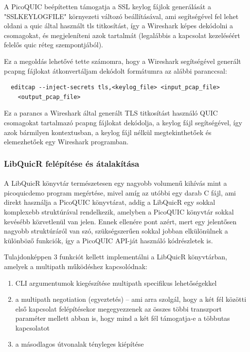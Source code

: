 \documentclass[a4paper,oneside]{article}
\begin{document}
A PicoQUIC beépítetten támogatja a SSL keylog fájlok generálását a "SSLKEYLOGFILE" környezeti változó 
beállításával, ami segítségével fel lehet oldani a quic által használt tls titkosítást,
így a Wireshark képes dekódolni a csomagokat, és megjeleníteni azok 
tartalmát (legalábbis a kapcsolat kezeléséért felelős quic réteg szempontjából).

Ez a megoldás lehetővé tette számomra, hogy a Wireshark segítségével generált 
pcapng fájlokat átkonvertáljam dekódolt formátumra az alábbi paranccsal:
\begin{verbatim}
  editcap --inject-secrets tls,<keylog_file> <input_pcap_file> 
    <output_pcap_file>
\end{verbatim}
Ez a parancs a Wireshark által generált TLS titkosítást használó QUIC 
csomagokat tartalmazó pcapng fájlokat dekódolja, a keylog fájl segítségével, így azok bármilyen kontextusban, a keylog fájl nélkül megtekinthetőek
és elemezhetőek egy Wireshark programban.


\subsubsection{LibQuicR felépítése és átalakítása}
\paragraph{}

A LibQuicR könyvtár természetesen egy nagyobb volumenű kihívás mint a picoquicdemo program 
megértése, mivel amíg az utóbbi egy darab C fájl, ami direkt használja a PicoQUIC könyvtárat,
addig a LibQuicR egy sokkal komplexebb struktúrával rendelkezik, amelyben a PicoQUIC könyvtár sokkal kevésébb közvetlenül van jelen.
Ennek ellenére pont azért, mert egy jelentősen nagyobb struktúráról van szó, szükségszerűen sokkal 
jobban elkülönülnek a különböző funkciók, így a PicoQUIC API-ját használó kódrészletek is.

Tulajdonképpen 3 funkciót kellett implementálni a LibQuicR könyvtárban,
amelyek a multipath működéshez kapcsolódnak:
\begin{enumerate}
  \item CLI argumentumok kiegészítése multipath specifikus lehetőségekkel

  \item a multipath negotiation (egyeztetés) – ami arra szolgál, hogy a két fél közötti első
  kapcsolat felépítésekor megegyezzenek az összes többi transzport paraméter mellett abban is, 
  hogy mind a két fél támogatja-e a többutas kapcsolatot

  \item a másodlagos útvonalak tényleges kiépítése

\end{enumerate}
\end{document}
